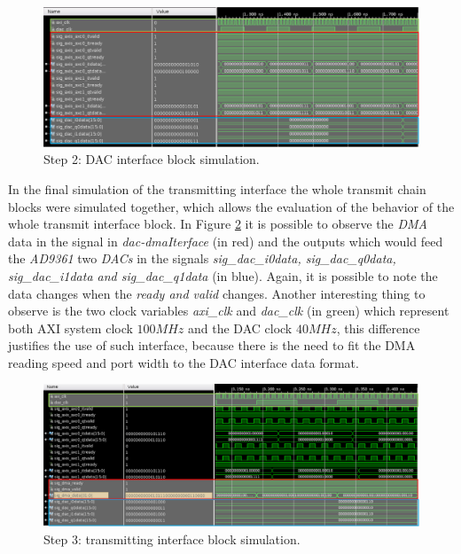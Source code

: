 \begin{figure}[htbp]
    \centering
    \includegraphics[width=1\textwidth]{./figures/dacInterface_m}
    \caption{ Step 2: DAC interface block simulation.
    \label{fig:simdac}}
\end{figure}

In the final simulation of the transmitting interface the whole transmit chain
blocks were simulated together, which allows the evaluation of the behavior of
the whole transmit interface block. In Figure \ref{fig:simtxif} it is possible
to observe the \textit{DMA} data in the signal in \textit{dac-dmaIterface} (in
red) and the outputs which would feed the \textit{AD9361} two \textit{DACs} in
the signals \textit{sig\_dac\_i0data, sig\_dac\_q0data, sig\_dac\_i1data and
sig\_dac\_q1data} (in blue). Again, it is possible to note the data changes when
the \textit{ready and valid} changes. Another interesting thing to observe is
the two clock variables \textit{axi\_clk} and \textit{dac\_clk} (in green) which
represent both AXI system \cite{xilinx:axiconn} clock $ 100 MHz$ and the DAC
clock $40 MHz$, this difference justifies the use of such interface, because
there is the need to fit the DMA reading speed and port width to the DAC
interface data format.


\begin{figure}[htbp]
    \centering
    \includegraphics[width=1\textwidth]{./figures/tx_sim_m}
    \caption{ Step 3: transmitting interface block simulation.
    \label{fig:simtxif}}
\end{figure}


